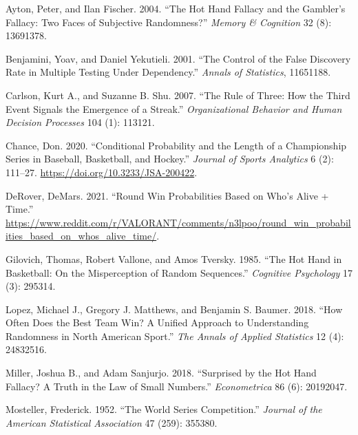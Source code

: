 \documentclass{article}
\newlength{\cslhangindent}
\newlength{\cslentryspacingunit} %
\newenvironment{CSLReferences}[2] %
 {%
  \setlength{\parindent}{0pt}
  \ifodd #1
  \let\oldpar\par
  \def\par{\hangindent=\cslhangindent\oldpar}
  \fi
  \setlength{\parskip}{#2\cslentryspacingunit}
 }%
 {}
\begin{document}
\hypertarget{refs}{}
\begin{CSLReferences}{1}{0}
\leavevmode{}%
Ayton, Peter, and Ilan Fischer. 2004. {``The Hot Hand Fallacy and the
Gambler{'}s Fallacy: Two Faces of Subjective Randomness?''} \emph{Memory
\& Cognition} 32 (8): 13691378.

\leavevmode{}%
Benjamini, Yoav, and Daniel Yekutieli. 2001. {``The Control of the False
Discovery Rate in Multiple Testing Under Dependency.''} \emph{Annals of
Statistics}, 11651188.

\leavevmode{}%
Carlson, Kurt A., and Suzanne B. Shu. 2007. {``The Rule of Three: How
the Third Event Signals the Emergence of a Streak.''}
\emph{Organizational Behavior and Human Decision Processes} 104 (1):
113121.

\leavevmode{}%
Chance, Don. 2020. {``Conditional Probability and the Length of a
Championship Series in Baseball, Basketball, and Hockey.''}
\emph{Journal of Sports Analytics} 6 (2): 111--27.
\url{https://doi.org/10.3233/JSA-200422}.

\leavevmode{}%
DeRover, DeMars. 2021. {``Round Win Probabilities Based on Who's Alive +
Time.''}
\url{https://www.reddit.com/r/VALORANT/comments/n3lpoo/round_win_probabilities_based_on_whos_alive_time/}.

\leavevmode{}%
Gilovich, Thomas, Robert Vallone, and Amos Tversky. 1985. {``The Hot
Hand in Basketball: On the Misperception of Random Sequences.''}
\emph{Cognitive Psychology} 17 (3): 295314.

\leavevmode{}%
Lopez, Michael J., Gregory J. Matthews, and Benjamin S. Baumer. 2018.
{``How Often Does the Best Team Win? A Unified Approach to Understanding
Randomness in North American Sport.''} \emph{The Annals of Applied
Statistics} 12 (4): 24832516.

\leavevmode{}%
Miller, Joshua B., and Adam Sanjurjo. 2018. {``Surprised by the Hot Hand
Fallacy? A Truth in the Law of Small Numbers.''} \emph{Econometrica} 86
(6): 20192047.

\leavevmode{}%
Mosteller, Frederick. 1952. {``The World Series Competition.''}
\emph{Journal of the American Statistical Association} 47 (259): 355380.


\end{CSLReferences}
\end{document}

